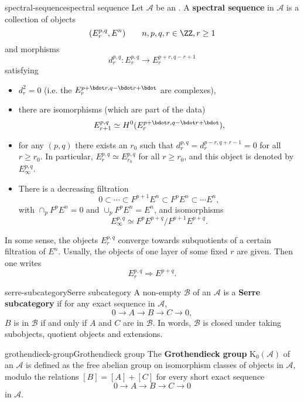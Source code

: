 \begin{topic}{spectral-sequence}{spectral sequence}
    Let $\mathcal{A}$ be an . A \textbf{spectral sequence} in $\mathcal{A}$ is a collection of objects
    \[ (E_r^{p, q}, E^n) \qquad n, p, q, r \in \ZZ, r \ge 1 \]
    and morphisms
    \[ d_r^{p, q} : E_r^{p, q} \to E_r^{p + r, q - r + 1} \]
    satisfying
    \begin{itemize}
        \item $d_r^2 = 0$ (i.e. the $E_r^{p + \bdot r, q - \bdot r + \bdot}$ are complexes),
        \item there are isomorphisms (which are part of the data)
        \[ E_{r + 1}^{p, q} \simeq H^0(E_r^{p + \bdot r, q - \bdot r + \bdot}), \]
        \item for any $(p, q)$ there exists an $r_0$ such that $d_r^{p, q} = d_r^{p - r, q + r - 1} = 0$ for all $r \ge r_0$. In particular, $E_r^{p, q} \simeq E_{r_0}^{p, q}$ for all $r \ge r_0$, and this object is denoted by $E_\infty^{p, q}$.
        \item There is a decreasing filtration
        \[ 0 \subset \cdots \subset F^{p + 1} E^n \subset F^p E^n \subset \cdots E^n , \]
        with $\cap_p F^p E^n = 0$ and $\cup_p F^p E^n = E^n$, and isomorphisms
        \[ E_\infty^{p, q} \simeq F^p E^{p + q} / F^{p + 1} E^{p + q} . \]
    \end{itemize}
    
    In some sense, the objects $E_r^{p, q}$ converge towards subquotients of a certain filtration of $E^n$. Usually, the objects of one layer of some fixed $r$ are given. Then one writes
    \[ E_r^{p, q} \Rightarrow E^{p + q} . \]
\end{topic}

\begin{topic}{serre-subcategory}{Serre subcategory}
    A non-empty  $\mathcal{B}$ of an  $\mathcal{A}$ is a \textbf{Serre subcategory} if for any exact sequence in $\mathcal{A}$,
    \[ 0 \to A \to B \to C \to 0 , \]
    $B$ is in $\mathcal{B}$ if and only if $A$ and $C$ are in $\mathcal{B}$. In words, $\mathcal{B}$ is closed under taking subobjects, quotient objects and extensions.
\end{topic}

\begin{topic}{grothendieck-group}{Grothendieck group}
    The \textbf{Grothendieck group} $\text{K}_0(\mathcal{A})$ of an  $\mathcal{A}$ is defined as the free abelian group on isomorphism classes of objects in $\mathcal{A}$, modulo the relations $[B] = [A] + [C]$ for every short exact sequence
    \[ 0 \to A \to B \to C \to 0 \]
    in $\mathcal{A}$.
\end{topic}

